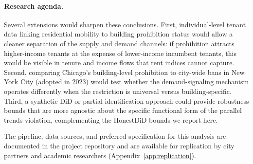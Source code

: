 \paragraph{Research agenda.} Several extensions would sharpen these conclusions. First, individual-level tenant data linking residential mobility to building prohibition status would allow a cleaner separation of the supply and demand channels: if prohibition attracts higher-income tenants at the expense of lower-income incumbent tenants, this would be visible in tenure and income flows that rent indices cannot capture. Second, comparing Chicago's building-level prohibition to city-wide bans in New York City (adopted in 2023) would test whether the demand-signaling mechanism operates differently when the restriction is universal versus building-specific. Third, a synthetic DiD or partial identification approach \citep{arkhangelsky2021synthetic} could provide robustness bounds that are more agnostic about the specific functional form of the parallel trends violation, complementing the HonestDiD bounds we report here.

The pipeline, data sources, and preferred specification for this analysis are documented in the project repository and are available for replication by city partners and academic researchers (Appendix~\ref{app:replication}).
